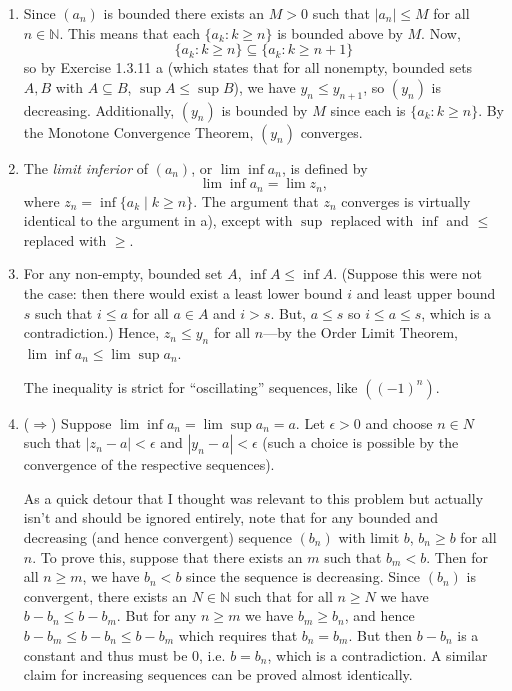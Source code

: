 \documentclass[a4paper]{report}
\newenvironment{ex}[1]
    {\noindent{\large \bf Exercise #1.}}{\vspace{0.5cm}}
\begin{document}
\begin{ex}{2.4.7}
  \begin{enumerate}[label=\alph*)]
    \item  Since $(a_n)$ is bounded there exists an $M > 0$ such that $|a_n| \leq M$ for all $n \in \mathbb{N}$. This means that each $\{a_k : k \geq n\}$ is bounded above by $M$. Now, 
\[
\{a_k : k \geq n\} \subseteq \{a_k : k \geq n +1\}
\]
so by Exercise 1.3.11 a (which states that for all nonempty, bounded sets $A, B$ with $A \subseteq B$, $\sup A \leq \sup B$), we have
$y_n \leq y_{n+1}$, so $(y_n)$ is decreasing. Additionally, $(y_n)$ is bounded by $M$ since each is $\{a_k : k \geq n\}$. By the Monotone Convergence Theorem, $(y_n)$ converges.

  \item The \emph{limit inferior} of $(a_n)$, or $\lim \inf a_n$, is defined by
\[
  \lim \inf a_n = \lim z_n,
\]
where $z_n = \inf\{a_k \mid k \geq n\}$. The argument that $z_n$ converges is virtually identical to the argument in a), except with $\sup$ replaced with $\inf$ and $\leq$ replaced with $\geq$.

\item  For any non-empty, bounded set $A$, $\inf A \leq \inf A$. (Suppose this were not the case: then there would exist a least lower bound $i$ and least upper bound $s$ such that $i \leq a$ for all $a \in A$ and $i > s$. But, $a \leq s$ so $i \leq a \leq s$, which is a contradiction.) Hence, $z_n \leq y_n$ for all $n$---by the Order Limit Theorem, $\lim \inf a_n \leq \lim \sup a_n$.

The inequality is strict for ``oscillating'' sequences, like $((-1)^n)$.

\item ($\Longrightarrow$) Suppose $\lim \inf a_n = \lim \sup a_n = a$. Let $\epsilon > 0$ and choose $n \in N$ such that $|z_n - a| < \epsilon$ and $|y_n -a| < \epsilon$ (such a choice is possible by the convergence of the respective sequences). 

As a quick detour that I thought was relevant to this problem but actually isn't and should be ignored entirely, note that for any bounded and decreasing (and hence convergent) sequence $(b_n)$ with limit $b$, $b_n \geq b$ for all $n$. To prove this, suppose that there exists an $m$ such that $b_m < b$. Then for all $n \geq m$, we have $b_n < b$ since the sequence is decreasing. Since $(b_n)$ is convergent, there exists an $N \in \mathbb{N}$ such that for all $n \geq N$ we have $b - b_n \leq b - b_m$. But for any $n \geq m$ we have
$b_m \geq b_n$, and hence $b - b_m \leq b - b_n \leq b - b_m$ which requires that $b_n = b_m$. But then $b - b_n$ is a constant and thus must be 0, i.e. $b = b_n$, which is a contradiction. A similar claim for increasing sequences can be proved almost identically.


\end{enumerate}
\end{ex}
\end{document}
